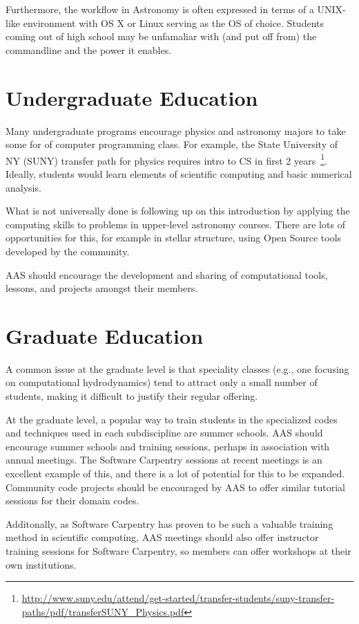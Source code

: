 \documentclass[11pt]{article}
\begin{document}
Furthermore, the workflow in Astronomy is often expressed in terms of
a UNIX-like environment with OS X or Linux serving as the OS of
choice.  Students coming out of high school may be unfamaliar with
(and put off from) the commandline and the power it enables.

\section{Undergraduate Education}

Many undergraduate programs encourage physics and astronomy majors to
take some for of computer programming class.  For example, the State
University of NY (SUNY) transfer path for physics requires intro to CS
in first 2
years~\footnote{\url{http://www.suny.edu/attend/get-started/transfer-students/suny-transfer-paths/pdf/transferSUNY_Physics.pdf}}.
Ideally, students would learn elements of scientific computing
and basic numerical analysis.

What is not universally done is following up on this introduction
by applying the computing skills to problems in upper-level
astronomy courses.  There are lots of opportunities for
this, for example in stellar structure, using Open Source
tools developed by the community.

AAS should encourage the development and sharing of computational
tools, lessons, and projects amongst their members.



\section{Graduate Education}

A common issue at the graduate level is that speciality classes (e.g.,
one focusing on computational hydrodynamics) tend to attract only a
small number of students, making it difficult to justify their regular
offering.

At the graduate level, a popular way to train students in the specialized
codes and techniques used in each subdiscipline are summer schools.
AAS should encourage summer schools and training sessions, perhaps in 
association with annual meetings.  The Software Carpentry sessions
at recent meetings is an excellent example of this, and there is 
a lot of potential for this to be expanded.  Community code projects
should be encouraged by AAS to offer similar tutorial sessions for 
their domain codes.  

Additonally, as Software Carpentry has proven to be such a valuable
training method in scientific computing, AAS meetings should also
offer instructor training sessions for Software Carpentry, so members
can offer workshops at their own institutions.
\end{document}
